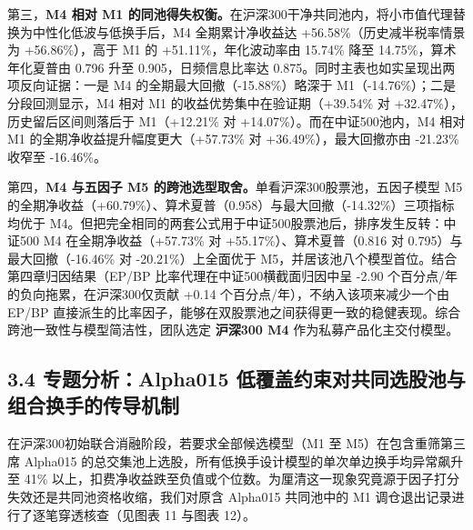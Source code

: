\documentclass[12pt,a4paper]{article}
\let\origsubsection\subsection
\renewcommand{\subsection}[1]{\needspace{4\baselineskip}\origsubsection{#1}}
\begin{document}
第三，\textbf{M4 相对 M1 的同池得失权衡。}在沪深300干净共同池内，将小市值代理替换为中性化低波与低换手后，M4 全期累计净收益达 +56.58\%（历史减半税率情景为 +56.86\%），高于 M1 的 +51.11\%，年化波动率由 15.74\% 降至 14.75\%，算术年化夏普由 0.796 升至 0.905，日频信息比率达 0.875。同时主表也如实呈现出两项反向证据：一是 M4 的全期最大回撤（-15.88\%）略深于 M1（-14.76\%）；二是分段回测显示，M4 相对 M1 的收益优势集中在验证期（+39.54\% 对 +32.47\%），历史留后区间则落后于 M1（+12.21\% 对 +14.07\%）。而在中证500池内，M4 相对 M1 的全期净收益提升幅度更大（+57.73\% 对 +36.49\%），最大回撤亦由 -21.23\% 收窄至 -16.46\%。

第四，\textbf{M4 与五因子 M5 的跨池选型取舍。}单看沪深300股票池，五因子模型 M5 的全期净收益（+60.79\%）、算术夏普（0.958）与最大回撤（-14.32\%）三项指标均优于 M4。但把完全相同的两套公式用于中证500股票池后，排序发生反转：中证500 M4 在全期净收益（+57.73\% 对 +55.17\%）、算术夏普（0.816 对 0.795）与最大回撤（-16.46\% 对 -20.21\%）上全面优于 M5，并居该池八个模型首位。结合第四章归因结果（EP/BP 比率代理在中证500横截面归因中呈 -2.90 个百分点/年的负向拖累，在沪深300仅贡献 +0.14 个百分点/年），不纳入该项来减少一个由 EP/BP 直接派生的比率因子，能够在双股票池之间获得更一致的稳健表现。综合跨池一致性与模型简洁性，团队选定 \textbf{沪深300 M4} 作为私募产品化主交付模型。

\subsection{3.4 专题分析：Alpha015 低覆盖约束对共同选股池与组合换手的传导机制}

在沪深300初始联合消融阶段，若要求全部候选模型（M1 至 M5）在包含重筛第三席 Alpha015 的总交集池上选股，所有低换手设计模型的单次单边换手均异常飙升至 41\% 以上，扣费净收益跌至负值或个位数。为厘清这一现象究竟源于因子打分失效还是共同池资格收缩，我们对原含 Alpha015 共同池中的 M1 调仓退出记录进行了逐笔穿透核查（见图表 11 与图表 12）。
\end{document}
